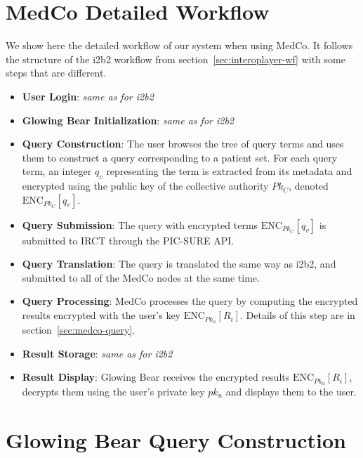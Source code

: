 \section{MedCo Detailed Workflow}

We show here the detailed workflow of our system when using MedCo.
It follows the structure of the i2b2 workflow from section~\ref{sec:interoplayer-wf} with some steps that are different.


\begin{itemize}
\item \textbf{User Login}: \emph{same as for i2b2}

\item \textbf{Glowing Bear Initialization}: \emph{same as for i2b2}

\item \textbf{Query Construction}:
The user browses the tree of query terms and uses them to construct a query corresponding to a patient set.
For each query term, an integer $q_v$ representing the term is extracted from its metadata and encrypted using the public key of the collective authority $Pk_C$, denoted $\text{ENC}_{Pk_C}[q_v]$.

\item \textbf{Query Submission}:
The query with encrypted terms $\text{ENC}_{Pk_C}[q_v]$ is submitted to IRCT through the PIC-SURE API.

\item \textbf{Query Translation}:
The query is translated the same way as i2b2, and submitted to all of the MedCo nodes at the same time.

\item \textbf{Query Processing}:
MedCo processes the query by computing the encrypted results encrypted with the user's key $\text{ENC}_{Pk_u}[R_i]$.
Details of this step are in section~\ref{sec:medco-query}.

\item \textbf{Result Storage}: \emph{same as for i2b2}

\item \textbf{Result Display}:
Glowing Bear receives the encrypted results $\text{ENC}_{Pk_u}[R_i]$, decrypts them using the user's private key $pk_u$ and displays them to the user.
\end{itemize}


\section{Glowing Bear Query Construction}

